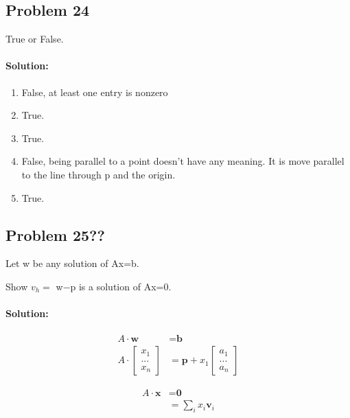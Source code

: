 \documentclass[11pt, notitlepage]{report}
\newenvironment{solution}{\paragraph{\small Solution:}}{\hfill}
\begin{document}
\subsection{Problem 24}

True or False.

\begin{solution}

\begin{enumerate}[label=\alph*.)]
	\item False, at least one entry is nonzero
	\item True.
	\item True.
	\item False, being parallel to a point doesn't have any meaning. It is move parallel to the line through p and the origin. 
	\item True.
\end{enumerate}

\end{solution}

\subsection{Problem 25??}

Let w be any solution of Ax=b.

Show $v_h=$ w$-$p is a solution of Ax=0.

\begin{solution}

\begin{align*}
A\cdot \textbf{w} &= \textbf{b} \\
A\cdot \begin{bmatrix}
	x_1 \\
	... \\
	x_n
\end{bmatrix} &= \textbf{p} + x_1 \begin{bmatrix}
	a_1 \\
	... \\
	a_n
\end{bmatrix}
\end{align*}

\begin{align*}
A\cdot \textbf{x} &= \textbf{0} \\
				  &= \sum_{i}{x_i\textbf{v}_i} \\
\end{align*}

\end{solution}
\end{document}
